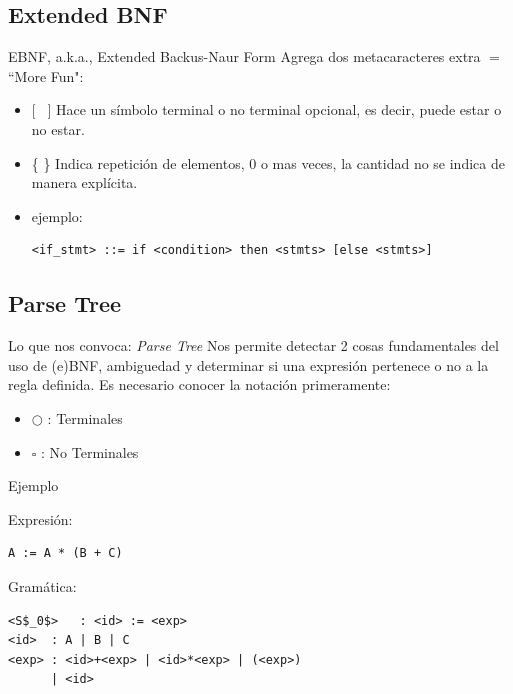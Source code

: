\documentclass{beamer}
\begin{document}
	\subsection{Extended BNF}
	
\begin{frame}[fragile]{EBNF, a.k.a., Extended Backus-Naur Form}
		Agrega dos metacaracteres extra $=$ ``More Fun":
        \begin{itemize}
        \item $[$ \ $]$ Hace un s\'imbolo terminal o no terminal opcional, es decir, puede estar o no 							estar.
        \item  \{ \} Indica repetición de elementos, 0 o mas veces, la cantidad no se indica de manera 						expl\'icita.
        \item ejemplo: 
\begin{lstlisting}
<if_stmt> ::= if <condition> then <stmts> [else <stmts>] 
\end{lstlisting}
        \end{itemize} 
\end{frame}
		
	\subsection{Parse Tree}
	\begin{frame}{Lo que nos convoca: \emph{Parse Tree}}
		Nos permite detectar 2 cosas fundamentales del uso de (e)BNF, ambiguedad y determinar si una expresi\'on pertenece o no a la regla definida.
		Es necesario conocer la notación primeramente:\\

		\bigskip
        \begin{itemize}
        \item $\bigcirc$ : Terminales
        \item $\square$ : No Terminales
        \end{itemize}
	\end{frame}
    
\begin{frame}[fragile]{Ejemplo}
\begin{example}
Expresión:
\begin{lstlisting}
A := A * (B + C)
\end{lstlisting}
Gramática:
\begin{lstlisting}
<S$_0$>   : <id> := <exp> 
<id>  : A | B | C
<exp> : <id>+<exp> | <id>*<exp> | (<exp>)
      | <id>
\end{lstlisting}
\end{example}
\end{frame}
\end{document}
